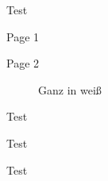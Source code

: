\documentclass[pdftex,logo,assignment]{newcsen}
\begin{document}
\csenmarktable


\begin{exercise}{5}{}{}
  Test
\end{exercise}

Page 1
\newpage

Page 2

\begin{figure}[ht]
  \centering
  \vspace*{3cm}
  \caption{Ganz in weiß}
  \label{fig:test}
\end{figure}

\begin{exercise}{6}{}{}
  Test
\end{exercise}

\begin{exercise}{7}{}{}
  Test
\end{exercise}
 
\begin{exercise}{8}{}{}
  Test
\end{exercise}
 

 
\end{document}

